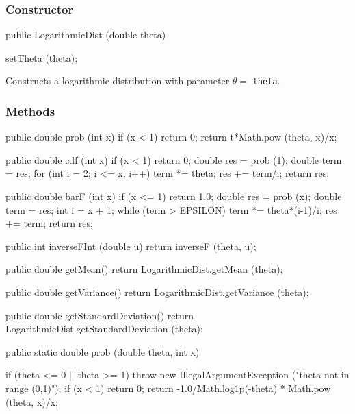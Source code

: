 \subsubsection* {Constructor}
\begin{code}

   public LogarithmicDist (double theta)\begin{hide} {
      setTheta (theta);
   }\end{hide}
\end{code}
  \begin{tabb} Constructs a logarithmic distribution with parameter $\theta = $
  \texttt{theta}.
 \end{tabb}

\subsubsection* {Methods}
\begin{code}\begin{hide}

   public double prob (int x) {
      if (x < 1)
         return 0;
      return t*Math.pow (theta, x)/x;
   }

   public double cdf (int x) {
      if (x < 1)
         return 0;
      double res = prob (1);
      double term = res;
      for (int i = 2; i <= x; i++) {
         term *= theta;
         res += term/i;
      }
      return res;
   }

   public double barF (int x) {
      if (x <= 1)
         return 1.0;
      double res = prob (x);
      double term = res;
      int i = x + 1;
      while (term > EPSILON) {
         term *= theta*(i-1)/i;
         res += term;
      }
      return res;
   }

   public int inverseFInt (double u) {
      return inverseF (theta, u);
   }

   public double getMean() {
      return LogarithmicDist.getMean (theta);
   }

   public double getVariance() {
      return LogarithmicDist.getVariance (theta);
   }

   public double getStandardDeviation() {
      return LogarithmicDist.getStandardDeviation (theta);
   }\end{hide}

   public static double prob (double theta, int x)\begin{hide} {
      if (theta <= 0 || theta >= 1)
         throw new IllegalArgumentException ("theta not in range (0,1)");
      if (x < 1)
         return 0;
      return -1.0/Math.log1p(-theta) * Math.pow (theta, x)/x;
   }\end{hide}
\end{code}
